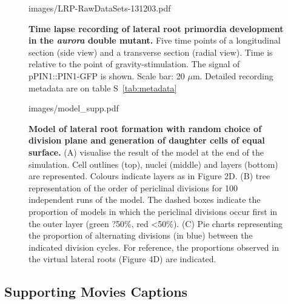 \documentclass[11pt,a4paper, draft]{article}
\begin{document}
%
\begin{figure}[htbp]
	\begin{overpic}[width=1.\linewidth]{images/LRP-RawDataSets-131203.pdf}
	\end{overpic}
\caption[ Time lapse recording of  lateral root primordia development in the \emph{aurora} double mutant.]
{{\bf Time lapse recording of  lateral root primordia development in the \emph{aurora} double mutant.} Five time points of a longitudinal section (side view) and a transverse section (radial view). Time is relative to the point of gravity-stimulation. The signal of pPIN1::PIN1-GFP  is shown. Scale bar: 20 $\mu$m. Detailed recording metadata are on table S~\ref{tab:metadata}}
\label{fig:aurora}
\end{figure}
%
\clearpage
%
\begin{figure}[htbp]
	\begin{overpic}[width=1.\linewidth]{images/model_supp.pdf}
	\end{overpic}
\caption[Model of lateral root formation with random choice of division plane and  generation of  daughter cells of equal surface.]
{{\bf Model of lateral root formation with random choice of division plane and  generation of  daughter cells of equal surface.} (A) visualise the result of the model at the end of the simulation. Cell outlines (top), nuclei (middle) and layers (bottom) are represented. Colours indicate layers as in Figure 2D. (B)  tree representation of the order of periclinal divisions for 100 independent runs of the model. The dashed boxes indicate the proportion of models in which the periclinal divisions occur first in the outer layer (green ?50\%, red <50\%). (C) Pie charts representing the proportion of alternating divisions (in blue) between the indicated division cycles. For reference, the proportions observed in the virtual lateral roots (Figure 4D) are indicated. }
\label{fig:modelrandea}
\end{figure}
%

\clearpage
\subsection{Supporting Movies Captions}
\setcounter{figure}{0}
\renewcommand{\figurename}{Movie}
\end{document}
